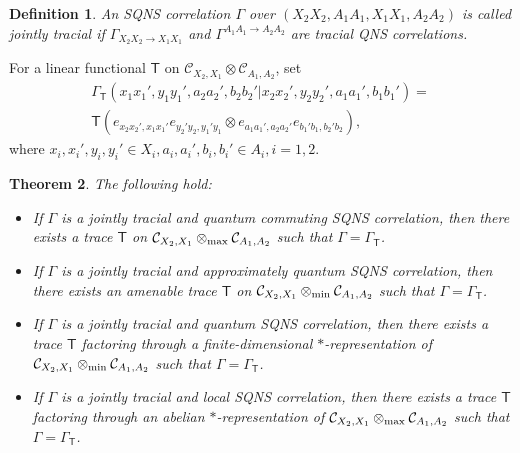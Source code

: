 \documentclass[11pt]{amsart}
\newtheorem{theorem}{Theorem}[section]
\newtheorem{definition}[theorem]{Definition}
\newcommand{\cl}[1]{\mathcal{#1}}
\begin{document}
\begin{definition}
An SQNS correlation $\Gamma$ over $(X_{2}X_{2}, A_{1}A_{1}, X_{1}X_{1}, A_{2}A_{2})$ is called {\rm jointly tracial} if $\Gamma_{X_{2}X_{2}\rightarrow X_{1}X_{1}}$ and $\Gamma^{A_{1}A_{1}\rightarrow A_{2}A_{2}}$ are tracial QNS correlations. 
\end{definition}
For a linear functional $\mathsf{T}$ on $\cl{C}_{X_{2}, X_{1}}\otimes \cl{C}_{A_{1}, A_{2}}$, set
\begin{gather*}
	\Gamma_{\mathsf{T}}(x_{1}x_{1}', y_{1}y_{1}', a_{2}a_{2}', b_{2}b_{2}'|x_{2}x_{2}', y_{2}y_{2}', a_{1}a_{1}', b_{1}b_{1}') = \\\mathsf{T}(e_{x_{2}x_{2}', x_{1}x_{1}'}e_{y_{2}'y_{2}, y_{1}'y_{1}}\otimes e_{a_{1}a_{1}', a_{2}a_{2}'}e_{b_{1}'b_{1}, b_{2}'b_{2}}),
\end{gather*}
\noindent where $x_{i}, x_{i}', y_{i}, y_{i}' \in X_{i}, a_{i}, a_{i}', b_{i}, b_{i}' \in A_{i}, i = 1, 2$. 
\begin{theorem}\label{joint_tracial_strategies_thm}
The following hold:
\begin{itemize}
	\item[(i)] If $\Gamma$ is a jointly tracial and quantum commuting SQNS correlation, then there exists a trace $\mathsf{T}$ on $\cl{C}_{X_{2}, X_{1}}\otimes_{\rm max} \cl{C}_{A_{1}, A_{2}}$ such that $\Gamma = \Gamma_{\mathsf{T}}$. 
	\item[(ii)] If $\Gamma$ is a jointly tracial and approximately quantum SQNS correlation, then there exists an amenable trace $\mathsf{T}$ on $\cl{C}_{X_{2}, X_{1}}\otimes_{\rm min} \cl{C}_{A_{1}, A_{2}}$ such that $\Gamma = \Gamma_{\mathsf{T}}$.
	\item[(iii)] If $\Gamma$ is a jointly tracial and quantum SQNS correlation, then there exists a trace $\mathsf{T}$ factoring through a finite-dimensional $*$-representation of $\cl{C}_{X_{2}, X_{1}}\otimes_{\rm min} \cl{C}_{A_{1}, A_{2}}$ such that $\Gamma = \Gamma_{\mathsf{T}}$.
	\item[(iv)] If $\Gamma$ is a jointly tracial and local SQNS correlation, then there exists a trace $\mathsf{T}$ factoring through an abelian $*$-representation of $\cl{C}_{X_{2}, X_{1}}\otimes_{\rm max} \cl{C}_{A_{1}, A_{2}}$ such that $\Gamma = \Gamma_{\mathsf{T}}$.
\end{itemize}
\end{theorem}
\end{document}
